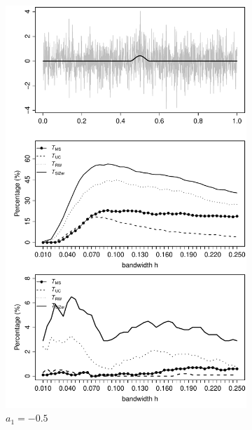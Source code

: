 \begin{figure}[t!]
\begin{subfigure}{0.5\textwidth}
\centering
\includegraphics[width=\linewidth]{Plots/pcp_power_T_1000_a1_-50.pdf}
\caption{$a_1 = -0.5$}
\end{subfigure}
\begin{subfigure}{0.5\textwidth}
\centering

\end{subfigure}
\end{figure}
